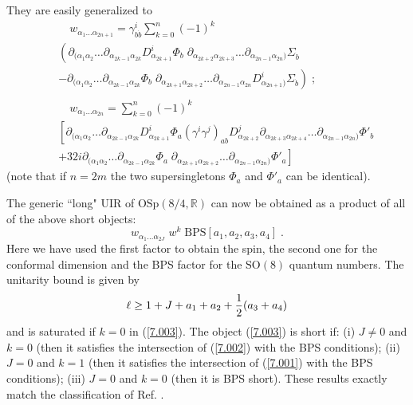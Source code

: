 \documentclass[a4paper,12pt]{article}
\begin{document}
They are easily generalized to
\begin{eqnarray}
  &&\quad w_{\alpha_1\ldots\alpha_{2n+1}}= \gamma^i_{b\dot b} \sum_{k=0}^{n}(-1)^k 
\label{7.0022}\\
&&\left(\partial_{(\alpha_1\alpha_2} \ldots 
\partial_{\alpha_{2k-1}\alpha_{2k}} D^i_{\alpha_{2k+1}} \Phi_b \;
\partial_{\alpha_{2k+2}\alpha_{2k+3}} \ldots 
\partial_{\alpha_{2n-1}\alpha_{2n})}\Sigma_{\dot b}\right. \nonumber\\ 
 &&\left. -\partial_{(\alpha_1\alpha_2} \ldots 
\partial_{\alpha_{2k-1}\alpha_{2k}}  \Phi_b\; 
\partial_{\alpha_{2k+1}\alpha_{2k+2}} \ldots 
\partial_{\alpha_{2n-1}\alpha_{2n}} D^i_{\alpha_{2n+1})}\Sigma_{\dot b}\right)\;; 
\nonumber\\ \nonumber\\ 
 &&\quad w_{\alpha_1\ldots\alpha_{2n}}= \sum_{k=0}^{n}(-1)^k 
\label{7.0023}\\
&&\left[ 
\partial_{(\alpha_1\alpha_2} \ldots 
\partial_{\alpha_{2k-1}\alpha_{2k}} D^i_{\alpha_{2k+1}}\Phi_a  (\gamma^i\gamma^j)_{ab} 
D^j_{\alpha_{2k+2}}\partial_{\alpha_{2k+3}\alpha_{2k+4}} \ldots 
\partial_{\alpha_{2n-1}\alpha_{2n})}\Phi'_b\right. \nonumber\\ 
 &&\left. + 32i  \partial_{(\alpha_1\alpha_2} \ldots 
\partial_{\alpha_{2k-1}\alpha_{2k}}  \Phi_a  \;
\partial_{\alpha_{2k+1}\alpha_{2k+2}} \ldots 
\partial_{\alpha_{2n-1}\alpha_{2n})} \Phi'_a\right] \nonumber
\end{eqnarray}
(note that if $n=2m$ the two supersingletons $\Phi_a$ and 
$\Phi'_a$ can be identical).  


The generic ``long" UIR of $\mbox{OSp}(8/4,\mathbb{R})$ can now be 
obtained as a product of all of the above short objects: 
\begin{equation}\label{7.003}
  w_{\alpha_1\ldots\alpha_{2J}}\; w^k\; 
\mbox{BPS}[a_1,a_2,a_3,a_4]\;.
\end{equation}
Here we have used the first factor to obtain the spin, the second 
one for the conformal dimension and the BPS factor for the 
$\mbox{SO}(8)$ quantum numbers. The unitarity bound is given by 
\begin{equation}\label{7.004}
  \ell \geq 1+J+a_1+a_2+{1\over 2}(a_3+a_4)
\end{equation}
and is saturated if $k=0$ in (\ref{7.003}). The object 
(\ref{7.003}) is short if: (i) $J\neq 0$ and $k=0$ (then it 
satisfies the intersection of (\ref{7.002}) with the BPS 
conditions); (ii) $J=0$ and $k=1$  (then it satisfies the 
intersection of (\ref{7.001}) with the BPS conditions); (iii) 
$J=0$ and $k=0$ (then it is BPS short). These results exactly 
match the classification of Ref. \cite{Minw2}.  
  
\end{document}

